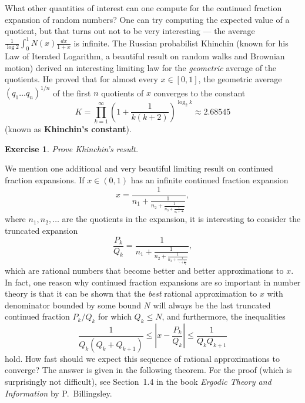 \documentclass[12pt]{article}
\newtheorem{exercise}[thm]{Exercise}
\theoremstyle{example}
\begin{document}
\begin{enumerate}
What other quantities of interest can one compute for the continued fraction expansion of random numbers? One can try computing the expected value of a quotient, but that turns out not to be very interesting --- the average 
$\frac{1}{\log 2} \int_0^1 N(x) \frac{dx}{1+x}$ is infinite. The Russian probabilist Khinchin (known for his Law of Iterated Logarithm, a beautiful result on random walks and Brownian motion) derived an interesting limiting law for the \emph{geometric} average of the quotients. He proved that for almost every $x\in[0,1]$, the geometric average $(q_1\ldots q_n)^{1/n}$ of the first $n$ quotients of $x$ converges to the constant
$$ K = \prod_{k=1}^\infty \left( 1+\frac{1}{k(k+2)} \right)^{\log_2 k} \approx 2.68545 $$
(known as \textbf{Khinchin's constant}).

\begin{exercise}
Prove Khinchin's result.
\end{exercise}

We mention one additional and very beautiful limiting result on continued fraction expansions. If $x\in (0,1)$ has an infinite continued fraction expansion
$$ x = \frac{1}{n_1+\frac{1}{n_2+\frac{1}{n_3+\frac{1}{n_4+\frac{1}{\ldots}}}}},
$$
where $n_1,n_2,\ldots$ are the quotients in the expansion, it is interesting to consider the truncated expansion
$$ \frac{P_k}{Q_k} = \frac{1}{n_1+\frac{1}{n_2+\frac{1}{n_3+\frac{1}{\ddots+\frac{1}{n_k}}}}},
$$
which are rational numbers that become better and better approximations to $x$. In fact, one reason why continued fraction expansions are so important in number theory is that it can be shown that the \emph{best} rational approximation to $x$ with denominator bounded by some bound $N$ will always be the last truncated continued fraction $P_k/Q_k$ for which $Q_k\le N$, and furthermore, the inequalities
\begin{equation} \label{eq:cont-frac-approx}
 \frac{1}{Q_k (Q_k+Q_{k+1})} \le \left|x - \frac{P_k}{Q_k} \right| \le \frac{1}{Q_k Q_{k+1}}
 \end{equation}
hold. How fast should we expect this sequence of rational approximations to converge? The answer is given in the following theorem. For the proof (which is surprisingly not difficult), see Section~1.4 in the book \textit{Ergodic Theory and Information} by P.\ Billingsley.


\end{enumerate}
\end{document}
